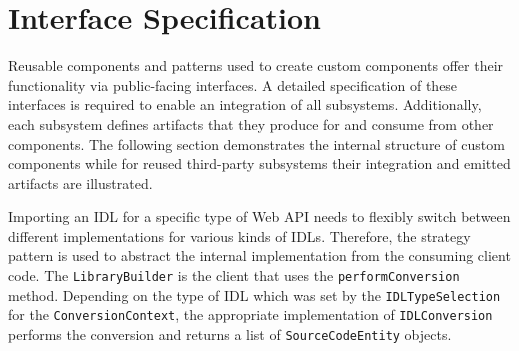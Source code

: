 \section{Interface Specification}
\label{sec:InterfaceSpecification}

Reusable components and patterns used to create custom components offer their functionality via public-facing interfaces. A detailed specification of these interfaces is required to enable an integration of all subsystems. Additionally, each subsystem defines artifacts that they produce for and consume from other components. The following section demonstrates the internal structure of custom components while for reused third-party subsystems their integration and emitted artifacts are illustrated.

\begin{figure}[!h]
\end{figure}

Importing an \ac{IDL} for a specific type of Web API needs to flexibly switch between different implementations for various kinds of \acp{IDL}. Therefore, the strategy pattern is used to abstract the internal implementation from the consuming client code. The \texttt{LibraryBuilder} is the client that uses the \texttt{performConversion} method. Depending on the type of IDL which was set by the \texttt{IDL\-Type\-Selec\-tion} for the \texttt{ConversionContext}, the appropriate implementation of \texttt{IDL\-Con\-ver\-sion} performs the conversion and returns a list of \texttt{SourceCodeEntity} objects. 

\begin{figure}[!h]
\end{figure}

